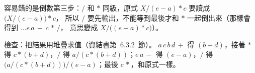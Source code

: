 \begin{pastsoln}
容易錯的是倒數第三步：$/$ 和 $*$ 同級，原式 $X / (e - a) * c$ 要讀成 $\bigl(X / (e - a)\bigr) * c$，
所以 $/$ 要先輸出，不能等到最後才和 $*$ 一起倒出來（那樣會得到 $\ldots e\,a\,-\,c\,*\,/$，
意思變成 $X / \bigl((e - a) * c\bigr)$）。

檢查：把結果用堆疊求值（資結書第~6.3.2~節）。 $a\,c\,b\,d\,+$ 得 $(b + d)$，接著 $*$ 得
$c * (b + d)$，$/$ 得 $a / (c * (b + d))$；$e\,a\,-$ 得 $(e - a)$，$/$ 得
$\bigl(a / (c * (b + d))\bigr) / (e - a)$；最後 $c\,*$，和原式一樣。
\end{pastsoln}
